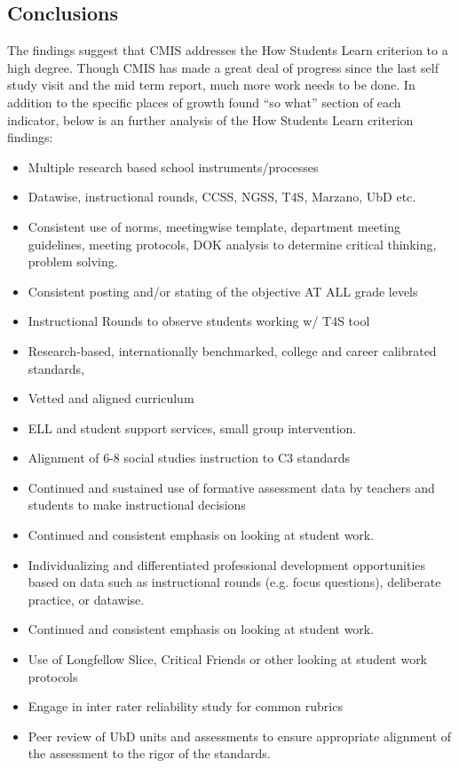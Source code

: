 \documentclass{report}
\begin{document}
\subsection{Conclusions}

\begin{findings}

The findings suggest that CMIS addresses the How Students Learn criterion to a high degree. Though CMIS has made a great deal of progress since the last self study visit and the mid term report, much more work needs to be done. In addition to the specific places of growth found “so what” section of each indicator, below is an further analysis of the How Students Learn criterion findings:

\begin{itemize}
\item Multiple research based school instruments/processes
\item Datawise, instructional rounds, CCSS, NGSS, T4S, Marzano, UbD etc. 
\item Consistent use of norms, meetingwise template, department meeting guidelines, meeting protocols, DOK analysis to determine critical thinking, problem solving.
\item Consistent posting and/or stating of the objective AT ALL grade levels
\item Instructional Rounds to observe students working w/ T4S tool
\item Research-based, internationally benchmarked, college and career calibrated standards, 
\item Vetted and aligned curriculum
\item ELL and student support services, small group intervention. 
\end{itemize}


\begin{itemize}
\item Alignment of 6-8 social studies instruction to C3 standards
\item Continued and sustained use of formative assessment data by teachers and students to make instructional decisions
\item Continued and consistent emphasis on looking at student work. 
\item Individualizing and differentiated professional development opportunities based on data such as instructional rounds (e.g. focus questions), deliberate practice, or datawise. 
\item Continued and consistent emphasis on looking at student work. 
\item Use of Longfellow Slice, Critical Friends or other looking at student work protocols 
\item Engage in inter rater reliability study for common rubrics
\item Peer review of UbD units and assessments  to ensure appropriate alignment of the assessment to the rigor of the standards. 
\end{itemize}
\end{findings}
\end{document}
